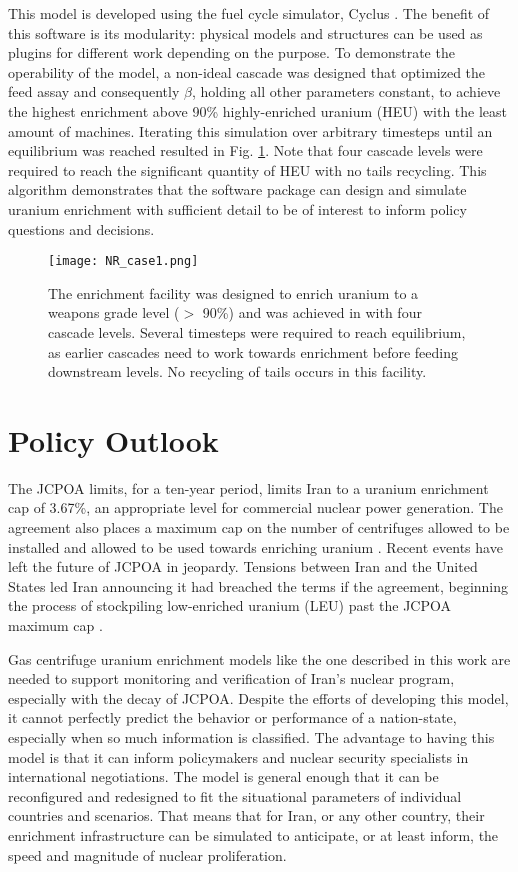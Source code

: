 \documentclass{article}
\begin{document}
This model is developed using the fuel cycle simulator, Cyclus \cite{cyclus}. The benefit of this software is its modularity: physical models and structures can be used as plugins for different work depending on the purpose. To demonstrate the operability of the model, a non-ideal cascade was designed that optimized the feed assay and consequently $\beta$, holding all other parameters constant, to achieve the highest enrichment above 90\% highly-enriched uranium (HEU) with the least amount of machines. Iterating this simulation over arbitrary timesteps until an equilibrium was reached resulted in Fig. \ref{fig:enrichment}. Note that four cascade levels were required to reach the significant quantity of HEU with no tails recycling. This algorithm demonstrates that the software package can design and simulate uranium enrichment with sufficient detail to be of interest to inform policy questions and decisions. 

\begin{figure}
    \centering
    \texttt{[image: NR\_case1.png]}
    \caption{The enrichment facility was designed to enrich uranium to a weapons grade level ($>$ 90\%) and was achieved in with four cascade levels. Several timesteps were required to reach equilibrium, as earlier cascades need to work towards enrichment before feeding downstream levels. No recycling of tails occurs in this facility.}
    \label{fig:enrichment}
\end{figure}

\section{Policy Outlook}

The JCPOA limits, for a ten-year period, limits Iran to a uranium enrichment cap of 3.67\%, an appropriate level for commercial nuclear power generation. The agreement also places a maximum cap on the number of centrifuges allowed to be installed and allowed to be used towards enriching uranium \cite{jcpoa}. Recent events have left the future of JCPOA in jeopardy. Tensions between Iran and the United States led Iran announcing it had breached the terms if the agreement, beginning the process of stockpiling low-enriched uranium (LEU) past the JCPOA maximum cap \cite{ap_news}.

Gas centrifuge uranium enrichment models like the one described in this work are needed to support monitoring and verification of Iran’s nuclear program, especially with the decay of JCPOA. Despite the efforts of developing this model, it cannot perfectly predict the behavior or performance of a nation-state, especially when so much information is classified. The advantage to having this model is that it can inform policymakers and nuclear security specialists in international negotiations. The model is general enough that it can be reconfigured and redesigned to fit the situational parameters of individual countries and scenarios. That means that for Iran, or any other country, their enrichment infrastructure can be simulated to anticipate, or at least inform, the speed and magnitude of nuclear proliferation.
\end{document}
